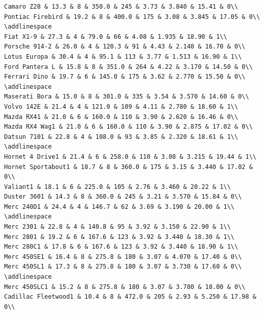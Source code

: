 \documentclass[a4paper, nobind]{templates/ociamthesis}
\begin{document}
\begin{verbatim}
Camaro Z28 & 13.3 & 8 & 350.0 & 245 & 3.73 & 3.840 & 15.41 & 0\\
Pontiac Firebird & 19.2 & 8 & 400.0 & 175 & 3.08 & 3.845 & 17.05 & 0\\
\addlinespace
Fiat X1-9 & 27.3 & 4 & 79.0 & 66 & 4.08 & 1.935 & 18.90 & 1\\
Porsche 914-2 & 26.0 & 4 & 120.3 & 91 & 4.43 & 2.140 & 16.70 & 0\\
Lotus Europa & 30.4 & 4 & 95.1 & 113 & 3.77 & 1.513 & 16.90 & 1\\
Ford Pantera L & 15.8 & 8 & 351.0 & 264 & 4.22 & 3.170 & 14.50 & 0\\
Ferrari Dino & 19.7 & 6 & 145.0 & 175 & 3.62 & 2.770 & 15.50 & 0\\
\addlinespace
Maserati Bora & 15.0 & 8 & 301.0 & 335 & 3.54 & 3.570 & 14.60 & 0\\
Volvo 142E & 21.4 & 4 & 121.0 & 109 & 4.11 & 2.780 & 18.60 & 1\\
Mazda RX41 & 21.0 & 6 & 160.0 & 110 & 3.90 & 2.620 & 16.46 & 0\\
Mazda RX4 Wag1 & 21.0 & 6 & 160.0 & 110 & 3.90 & 2.875 & 17.02 & 0\\
Datsun 7101 & 22.8 & 4 & 108.0 & 93 & 3.85 & 2.320 & 18.61 & 1\\
\addlinespace
Hornet 4 Drive1 & 21.4 & 6 & 258.0 & 110 & 3.08 & 3.215 & 19.44 & 1\\
Hornet Sportabout1 & 18.7 & 8 & 360.0 & 175 & 3.15 & 3.440 & 17.02 & 0\\
Valiant1 & 18.1 & 6 & 225.0 & 105 & 2.76 & 3.460 & 20.22 & 1\\
Duster 3601 & 14.3 & 8 & 360.0 & 245 & 3.21 & 3.570 & 15.84 & 0\\
Merc 240D1 & 24.4 & 4 & 146.7 & 62 & 3.69 & 3.190 & 20.00 & 1\\
\addlinespace
Merc 2301 & 22.8 & 4 & 140.8 & 95 & 3.92 & 3.150 & 22.90 & 1\\
Merc 2801 & 19.2 & 6 & 167.6 & 123 & 3.92 & 3.440 & 18.30 & 1\\
Merc 280C1 & 17.8 & 6 & 167.6 & 123 & 3.92 & 3.440 & 18.90 & 1\\
Merc 450SE1 & 16.4 & 8 & 275.8 & 180 & 3.07 & 4.070 & 17.40 & 0\\
Merc 450SL1 & 17.3 & 8 & 275.8 & 180 & 3.07 & 3.730 & 17.60 & 0\\
\addlinespace
Merc 450SLC1 & 15.2 & 8 & 275.8 & 180 & 3.07 & 3.780 & 18.00 & 0\\
Cadillac Fleetwood1 & 10.4 & 8 & 472.0 & 205 & 2.93 & 5.250 & 17.98 & 0\\

\end{verbatim}
\end{document}
